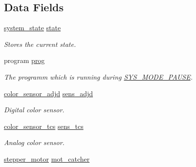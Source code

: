 \subsection*{Data Fields}
\begin{CompactItemize}
\item 
\hypertarget{structsmartie__sorter__t_e1f5a066e6d2b665e740e2e85abda282}{
\hyperlink{structsystem__state__t}{system\_\-state} \hyperlink{structsmartie__sorter__t_e1f5a066e6d2b665e740e2e85abda282}{state}}
\label{structsmartie__sorter__t_e1f5a066e6d2b665e740e2e85abda282}

\begin{CompactList}\small\item\em Stores the current state. \item\end{CompactList}\item 
\hypertarget{structsmartie__sorter__t_e79de6c1d37bb79d82dff4a2490b7c40}{
program \hyperlink{structsmartie__sorter__t_e79de6c1d37bb79d82dff4a2490b7c40}{prog}}
\label{structsmartie__sorter__t_e79de6c1d37bb79d82dff4a2490b7c40}

\begin{CompactList}\small\item\em The programm which is running during \hyperlink{system_8h_6e4cea4b6246f491c526211f5405627df1c8a041b6d3d46002d02ed0645a8ba2}{SYS\_\-MODE\_\-PAUSE}. \item\end{CompactList}\item 
\hypertarget{structsmartie__sorter__t_59076ebbfebca17e84e199762ac2e22d}{
\hyperlink{structcolor__sensor__adjd__t}{color\_\-sensor\_\-adjd} \hyperlink{structsmartie__sorter__t_59076ebbfebca17e84e199762ac2e22d}{sens\_\-adjd}}
\label{structsmartie__sorter__t_59076ebbfebca17e84e199762ac2e22d}

\begin{CompactList}\small\item\em Digital color sensor. \item\end{CompactList}\item 
\hypertarget{structsmartie__sorter__t_754376ba2843632710265283f54c1322}{
\hyperlink{structcolor__sensor__tcs__t}{color\_\-sensor\_\-tcs} \hyperlink{structsmartie__sorter__t_754376ba2843632710265283f54c1322}{sens\_\-tcs}}
\label{structsmartie__sorter__t_754376ba2843632710265283f54c1322}

\begin{CompactList}\small\item\em Analog color sensor. \item\end{CompactList}\item 
\hypertarget{structsmartie__sorter__t_b5ef065f7badb65086f95596429da8a0}{
\hyperlink{structstepper__motor__t}{stepper\_\-motor} \hyperlink{structsmartie__sorter__t_b5ef065f7badb65086f95596429da8a0}{mot\_\-catcher}}
\label{structsmartie__sorter__t_b5ef065f7badb65086f95596429da8a0}


\end{CompactItemize}
